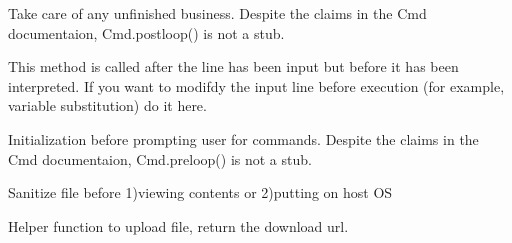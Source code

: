 \documentclass[letterpaper,12pt,openany,oneside]{sphinxmanual}
\begin{document}
\begin{fulllineitems}
\begin{fulllineitems}
\end{fulllineitems}


\begin{fulllineitems}
\label{main:main.Console.postloop}
Take care of any unfinished business.
Despite the claims in the Cmd documentaion,
Cmd.postloop() is not a stub.

\end{fulllineitems}


\begin{fulllineitems}
\label{main:main.Console.precmd}
This method is called after the line has been input but before
it has been interpreted. If you want to modifdy the input line
before execution (for example, variable substitution) do it here.

\end{fulllineitems}


\begin{fulllineitems}
\label{main:main.Console.preloop}
Initialization before prompting user for commands.
Despite the claims in the Cmd documentaion,
Cmd.preloop() is not a stub.

\end{fulllineitems}


\begin{fulllineitems}
\label{main:main.Console.san_file}
Sanitize file before 1)viewing contents or 2)putting on host OS

\end{fulllineitems}


\begin{fulllineitems}
\label{main:main.Console.upload_file}
Helper function to upload file, return the download url.

\end{fulllineitems}


\end{fulllineitems}
\end{document}
